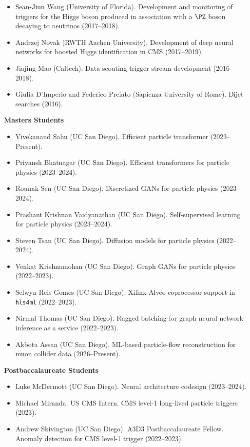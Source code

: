 \documentclass[11pt]{res}
\begin{document}
\begin{resume}
\begin{itemize}
    \item Sean-Jiun Wang (University of Florida). Development and monitoring of triggers for the Higgs boson produced in association with a $\PZ$ boson decaying to neutrinos ({2017--2018}).
    \item Andrzej Novak (RWTH Aachen University). Development of deep neural networks for boosted Higgs identification in CMS ({2017--2019}).
    \item Jiajing Mao (Caltech). Data scouting trigger stream development ({2016--2018}).
    \item Giulia D'Imperio and Federico Preiato (Sapienza University of Rome). Dijet searches ({2016}).
  \end{itemize}

  \textbf{Masters Students}
  \begin{itemize}
    \itemsep-0.3em
    \item Vivekanand Sahu (UC San Diego). Efficient particle transformer (2023--Present).
    \item Priyansh Bhatnagar (UC San Diego). Efficient transformers for particle physics (2023--2024).
    \item Rounak Sen (UC San Diego). Discretized GANs for particle physics (2023--2024).
    \item Prashant Krishnan Vaidyanathan (UC San Diego). Self-supervised learning for particle physics (2023--2024).
    \item Steven Tsan (UC San Diego). Diffusion models for particle physics (2022--2024).
    \item Venkat Krishnamohan (UC San Diego). Graph GANs for particle physics ({2022--2023}).
    \item Selwyn Reis Gomes (UC San Diego). Xilinx Alveo coprocessor support in \texttt{hls4ml} ({2022--2023}).
    \item Nirmal Thomas (UC San Diego). Ragged batching for graph neural network inference as a service ({2022--2023}).
    \item Akbota Assan (UC San Diego). ML-based particle-flow reconstruction for muon collider data (2026--Present).
  \end{itemize}

  \textbf{Postbaccalaureate Students}
  \begin{itemize}
    \item Luke McDermott (UC San Diego). Neural architecture codesign (2023--2024).
    \item Michael Miranda. US CMS Intern. CMS level-1 long-lived particle triggers (2023).
    \item Andrew Skivington (UC San Diego). A3D3 Postbaccalaureate Fellow. Anomaly detection for CMS level-1 trigger ({2022--2023}).
  \end{itemize}


\end{resume}
\end{document}
